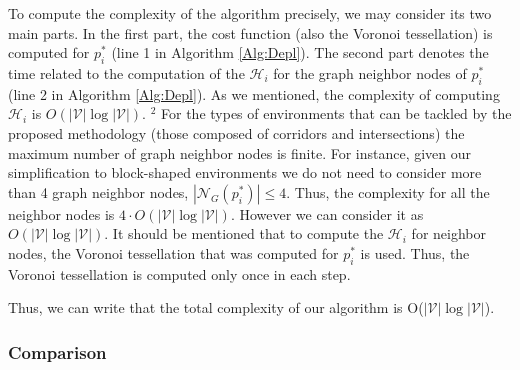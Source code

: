 \documentclass[smallcondensed]{svjour3}
\begin{document}
To compute the complexity of the algorithm precisely, we may consider its two main parts.
In the first part, the cost function (also the Voronoi tessellation) is computed for $p^*_i$ (line 1 in Algorithm \ref{Alg:Depl}). 
The second part denotes the time related to the computation of the $\mathcal{H}_i$ for the graph neighbor nodes of $p^*_i$ (line 2 in Algorithm \ref{Alg:Depl}). As we mentioned, the complexity of computing $\mathcal{H}_i$ is $O(|\mathcal{V}| \log |\mathcal{V}|)$. {\color{blue}$^2$ For the types of environments that can be tackled by the proposed methodology (those composed of corridors and intersections) the maximum number of graph neighbor nodes is finite. For instance, given our simplification to block-shaped environments  we do not need to consider more than 4 graph neighbor nodes, $|\mathcal{N}_G(p^*_i)| \leq 4$.} Thus, the complexity for all the neighbor nodes is $4\cdot O(|\mathcal{V}| \log |\mathcal{V}|)$. However we can consider it as $O(|\mathcal{V}| \log |\mathcal{V}|)$.
%
It should be mentioned that to compute the $\mathcal{H}_i$ for neighbor nodes, the Voronoi tessellation that was computed for $p^*_i$ is used. Thus, the Voronoi tessellation is computed only once in each step. 


Thus, we can write that the total complexity of our algorithm is O($|\mathcal{V}| \log |\mathcal{V}|$). 

\subsubsection{Comparison}
\end{document}
